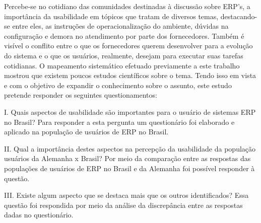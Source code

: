 Percebe-se no cotidiano das comunidades destinadas à discussão sobre ERP’s, a importância da usabilidade em tópicos que tratam de diversos temas, destacando-se entre eles, as instruções de operacionalização do ambiente, dúvidas na configuração e demora no atendimento por parte dos fornecedores. Também é visível o conflito entre o que os fornecedores querem desenvolver para a evolução do sistema e o que os usuários, realmente, desejam para executar suas tarefas cotidianas.\newline
\indent O mapeamento sistemático efetuado previamente a este trabalho mostrou que existem poucos estudos científicos sobre o tema. Tendo isso em vista e com o objetivo de expandir o conhecimento sobre o assunto, este estudo pretende responder os seguintes questionamentos:

	\begin{flushright}
	\begin{minipage}{.955\textwidth}
		I.	Quais aspectos de usabilidade são importantes para o usuário de sistemas ERP no Brasil? \newline
		Para responder a esta pergunta um questionário foi elaborado e aplicado na população de usuários de ERP no Brasil.
		
	\end{minipage}
	\end{flushright}

	\begin{flushright}
	\begin{minipage}{.955\textwidth}
		II. Qual a importância destes aspectos na percepção da usabilidade da população usuários da Alemanha x Brasil? \newline
		Por meio da comparação entre as respostas das populações de usuários de ERP no Brasil e da Alemanha foi possível responder à questão.
		
	\end{minipage}
	\end{flushright}

	\begin{flushright}
	\begin{minipage}{.955\textwidth}
		III. Existe algum aspecto que se destaca mais que os outros identificados? \newline
		Essa questão foi respondida por meio da análise da discrepância entre as respostas dadas no questionário.
		
	\end{minipage}
	\end{flushright}

